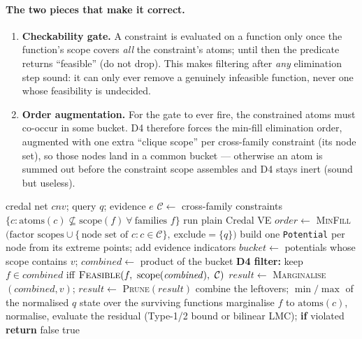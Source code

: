 \documentclass[11pt]{article}
\begin{document}
\paragraph{The two pieces that make it correct.}
\begin{enumerate}
  \item \textbf{Checkability gate.} A constraint is evaluated on a function only once the
    function's scope covers \emph{all} the constraint's atoms; until then the predicate
    returns ``feasible'' (do not drop). This makes filtering after \emph{any} elimination step
    sound: it can only ever remove a genuinely infeasible function, never one whose
    feasibility is undecided.
  \item \textbf{Order augmentation.} For the gate to ever fire, the constrained atoms must
    co-occur in some bucket. D4 therefore forces the min-fill elimination order, augmented
    with one extra ``clique scope'' per cross-family constraint (its node set), so those nodes
    land in a common bucket --- otherwise an atom is summed out before the constraint scope
    assembles and D4 stays inert (sound but useless).
\end{enumerate}

\begin{algorithm}[t]
\caption{D4 coupled Credal VE (\texttt{coupling="cross-family"})}
\label{alg:d4}
\begin{algorithmic}[1]
\Require credal net $\mathit{cnv}$; query $q$; evidence $e$
\State $\mathcal C \gets$ cross-family constraints
  $\{c:\mathrm{atoms}(c)\not\subseteq\mathrm{scope}(f)\ \forall\ \text{families } f\}$
 run plain Credal VE 
\EndIf
\State $\mathit{order}\gets$ \textsc{MinFill}$\big(\text{factor scopes}\cup\{\,\text{node set
  of }c : c\in\mathcal C\},\ \text{exclude}{=}\{q\}\big)$
\State build one \texttt{Potential} per node from its extreme points; add evidence indicators
  \State $\mathit{bucket}\gets$ potentials whose scope contains $v$;
    $\mathit{combined}\gets$ product of the bucket
  \State \textbf{D4 filter:} keep $f\in\mathit{combined}$ iff
    $\textsc{Feasible}(f,\ \mathrm{scope}(\mathit{combined}),\ \mathcal C)$
  \State $\mathit{result}\gets$ \textsc{Marginalise}$(\mathit{combined},v)$;
    $\mathit{result}\gets$ \textsc{Prune}$(\mathit{result})$
\EndFor
\State combine the leftovers; \Return $\min/\max$ of the normalised $q$ state over the
  surviving functions
\Statex
{}
     \State marginalise $f$ to $\mathrm{atoms}(c)$, normalise, evaluate the residual
       (Type-1/2 bound or bilinear LMC); \textbf{if} violated \textbf{return} false
  \EndFor
  \State \Return true 
\EndFunction
\end{algorithmic}
\end{algorithm}
\end{document}
